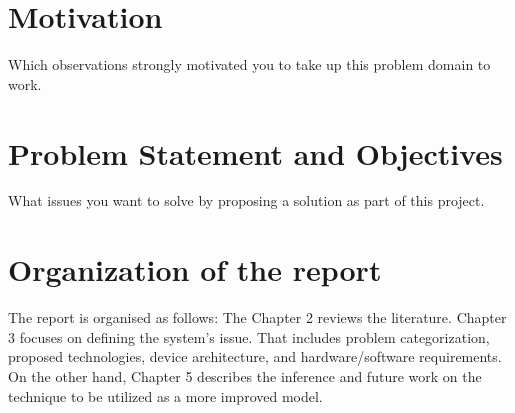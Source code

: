 \section{Motivation}
Which observations strongly motivated you to take up this problem domain to work.
\section{Problem Statement and Objectives}



What issues you want to solve by proposing a solution as part of this project.
\section{Organization of the report}

The report is organised as follows: The Chapter 2 reviews the literature. Chapter 3 focuses on defining the system's issue. That includes problem categorization, proposed technologies, device architecture, and hardware/software requirements. On the other hand, Chapter 5 describes the inference and future work on the technique to be utilized as a more improved model.
